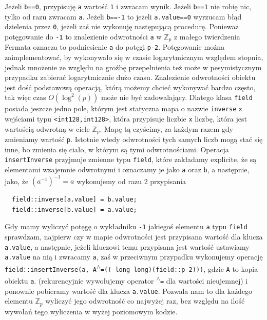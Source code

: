\documentclass{article}
\begin{document}
Jeżeli \texttt{b==0}, przypisuję \texttt{a} wartość \texttt{1} i zwracam wynik. Jeżeli \texttt{b==1} 
nie robię nic, tylko od razu zwracam \texttt{a}. Jeżeli \texttt{b==-1} to jeżeli \texttt{a.value==0} 
wyrzucam błąd dzielenia przez \texttt{0}, jeżeli zaś nie wykonuję następującą procedurę.
Ponieważ potęgowanie do \texttt{-1} to znalezienie odwrotności \texttt{a} w $\mathbb{Z}_p$
z małego twierdzenia Fermata oznacza to podniesienie \texttt{a} do potęgi 
\texttt{p-2}. Potęgowanie można zaimplementować, by wykonywało się w czasie logarytmicznym
względem stopnia, jednak mnożenie ze względu na groźbę przepełnienia
też może w pesymistycznym przypadku zabierać logarytmicznie dużo czasu.
Znalezienie odwrotności obiektu jest dość podstawową operacją, którą 
możemy chcieć wykonywać bardzo często, tak więc czas $O(\log ^2(p))$ może
nie być zadowalający. Dlatego klasa \texttt{field} posiada jeszcze jedno pole, którym
jest statyczna mapa o nazwie \texttt{inverse} z wejściami typu 
\texttt{<\texttt{\textunderscore \textunderscore int128},\texttt{\textunderscore \textunderscore int128}>}, która przypisuje 
liczbie \texttt{x} liczbę, która jest wartością odwrotną w ciele $\mathbb{Z}_p$. Mapę tą
czyścimy, za każdym razem gdy zmieniamy wartość \texttt{p}. Istotnie wtedy odwrotności
tych samych liczb mogą stać się inne, bo zmienia się ciało, w którym są tymi odwrotnościami.
Operacja \texttt{insertInverse} przyjmuje zmienne typu \texttt{field}, które zakładamy
explicite, że są elementami wzajemnie odwrotnymi i oznaczamy je jako \texttt{a} oraz \texttt{b}, 
a następnie, jako, że $(a^{-1})^{-1}=a$ wykonujemy od razu 2 przypisania
\begin{lstlisting}
  field::inverse[a.value] = b.value;
  field::inverse[b.value] = a.value;
\end{lstlisting}
Gdy mamy wyliczyć potęgę o wykładniku \texttt{-1} jakiegoś elementu \texttt{a} typu \texttt{field} sprawdzam, 
najpierw czy w mapie odwrotności jest przypisana wartość dla klucza \texttt{a.value}, 
a następnie, jeżeli kluczowi temu przypisana jest wartość ustawiamy \texttt{a.value} na nią i zwracamy \texttt{a}, zaś
w przeciwnym przypadku wykonujemy operację 
\texttt{field::insertInverse(a, A\textsuperscript{$\wedge$}=(( long long)(field::p-2)))}, gdzie \texttt{A} to kopia
obiektu \texttt{a}.
(rekurencyjnie wywołujemy operator \texttt{\textsuperscript{$\wedge$}=} dla wartości nieujemnej)
i ponownie pobieramy wartość dla klucza \texttt{a.value}. Pozwala nam to dla każdego elementu 
$\mathbb{Z}_p$ wyliczyć
jego odwrotność co najwyżej raz, bez względu na ilość wywołań tego wyliczenia w wyżej poziomowym 
kodzie. 
\end{document}
